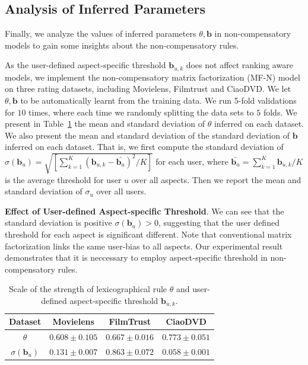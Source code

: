 \documentclass[letterpaper]{article} %
\begin{document}
\subsection{Analysis of Inferred Parameters}

Finally, we analyze the values of inferred parameters $\theta,\mathbf{b}$ in non-compensatory models to gain some insights about the non-compensatory rules. 

As the user-defined aspect-specific threshold $\mathbf{b}_{u,k}$ does not affect ranking aware models, we implement the non-compensatory matrix factorization (MF-N) model on three rating datasets, including Movielens, Filmtrust and CiaoDVD. We let $\theta,\mathbf{b}$ to be automatically learnt from the training data. We run 5-fold validations for $10$ times, where each time we randomly splitting the data sets to $5$ folds. We present in Table~\ref{tab:parameters} the mean and standard deviation of $\theta$ inferred on each dataset. We also present the mean and standard deviation of the standard deviation of $\mathbf{b}$ inferred on each dataset. That is, we first compute the standard deviation of $\sigma(\mathbf{b}_u)=\sqrt {[\sum_{k=1}^{K} (\mathbf{b}_{u,k}-\bar{\mathbf{b}_u})^2 /K]} $ for each user, where $\bar{\mathbf{b}_u}=\sum_{k=1}^K \mathbf{b}_{u,k} /K$ is the average threshold for user $u$ over all aspects. Then we report the mean and standard deviation of $\sigma_u$ over all users. 


\textbf{Effect of User-defined Aspect-specific Threshold}. We can see that the standard deviation is positive $\sigma(\mathbf{b}_{u})>0$, suggesting that the user defined threshold for each aspect is significant different. Note that conventional matrix factorization links the same user-bias to all aspects. Our experimental result demonstrates that it is neccessary to employ aspect-specific threshold in non-compensatory rules. 
\begin{table}[htp]
\tiny
\caption{Scale of the strength of lexicographical rule $\theta$ and user-defined aspect-specific threshold $\mathbf{b}_{u,k}$.}
\begin{center}
\begin{tabular}{|c|c|c|c|}
\hline
Dataset & Movielens & FilmTrust & CiaoDVD \\\hline
$\theta$ & $0.608\pm 0.105$ & $0.667\pm 0.016$ &	$0.773\pm 0.051$\\\hline
$\sigma(\mathbf{b}_{u})$ & $0.131\pm 0.007$ &	$0.863\pm 0.072$	& $0.058\pm 0.001$  \\\hline
\end{tabular}
\vspace*{-10pt}
\end{center}
\label{tab:parameters}
\end{table}%
\end{document}
